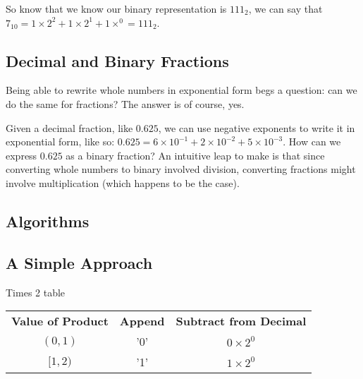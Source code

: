 \documentclass[12pt]{article}
\begin{document}
\par So know that we know our binary representation is $111_2$, we can say that $7_{10} = 1\times2^2+1\times2^1+1\times^0 = 111_2$.

\subsection{Decimal and Binary Fractions}
Being able to rewrite whole numbers in exponential form begs a question: can we do the same for fractions? The answer is of course, yes.

\par Given a decimal fraction, like $0.625$, we can use negative exponents to write it in exponential form, like so: $0.625 = 6\times10^{-1}+2\times10^{-2}+5\times10^{-3}$. How can we express $0.625$ as a binary fraction? An intuitive leap to make is that since converting whole numbers to binary involved division, converting fractions might involve multiplication (which happens to be the case).

\par



\newpage %



\begin{center}
\section{Algorithms}
\end{center}
\subsection{A Simple Approach}
Times 2 table
\begin{center}
\begin{tabular}{c|c|c}
    \textbf{Value of Product} & \textbf{Append} & \textbf{Subtract from Decimal} \\
    $(0,1)$   & '0' & $0\times2^0$ \\
    $[1,2)$   & '1' & $1\times2^0$
\end{tabular}
\end{center}
\end{document}
